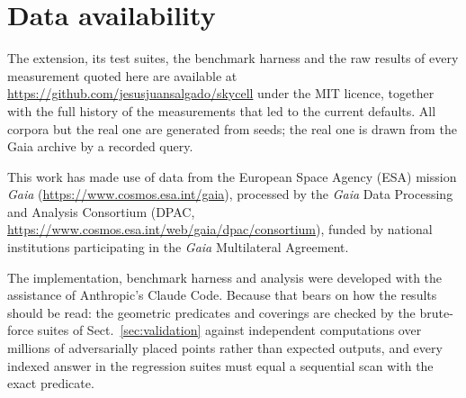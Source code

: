 
\maketitle

\providecommand{\Sect}{Sect.}


\section*{Data availability}

The extension, its test suites, the benchmark harness and the raw results of every
measurement quoted here are available at
\url{https://github.com/jesusjuansalgado/skycell} under the MIT licence, together with
the full history of the measurements that led to the current defaults. All corpora but
the real one are generated from seeds; the real one is drawn from the Gaia archive by a
recorded query.

\begin{acknowledgements}
  This work has made use of data from the European Space Agency (ESA) mission
  \emph{Gaia} (\url{https://www.cosmos.esa.int/gaia}), processed by the \emph{Gaia}
  Data Processing and Analysis Consortium (DPAC,
  \url{https://www.cosmos.esa.int/web/gaia/dpac/consortium}), funded by national
  institutions participating in the \emph{Gaia} Multilateral Agreement.

  The implementation, benchmark harness and analysis were developed with the assistance
  of Anthropic's Claude Code. Because that bears on how the results should be read: the
  geometric predicates and coverings are checked by the brute-force suites of
  Sect.~\ref{sec:validation} against independent computations over millions of
  adversarially placed points rather than expected outputs, and every indexed answer in
  the regression suites must equal a sequential scan with the exact predicate.
\end{acknowledgements}
